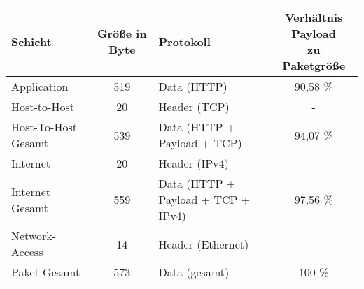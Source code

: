 \begin{longtable}{l|c|l|c}
    \hline
    Schicht & Größe in Byte & Protokoll & \makecell[l]{Verhältnis Payload \\zu Paketgröße}
    \\\hline
    Application & 519 & Data (HTTP) & 90,58 \%
    \\\hline
    Host-to-Host & 20 & Header (TCP) & -
    \\\hline
    Host-To-Host Gesamt & 539 & Data (HTTP + Payload + TCP) & 94,07 \%
    \\\hline
    Internet & 20 & Header (IPv4) & -
    \\\hline
    Internet Gesamt & 559 & Data (HTTP + Payload + TCP + IPv4) & 97,56 \%
    \\\hline
    Network-Access & 14 & Header (Ethernet) & - 
    \\\hline
    Paket Gesamt & 573 & Data (gesamt) & 100 \%

\end{longtable}